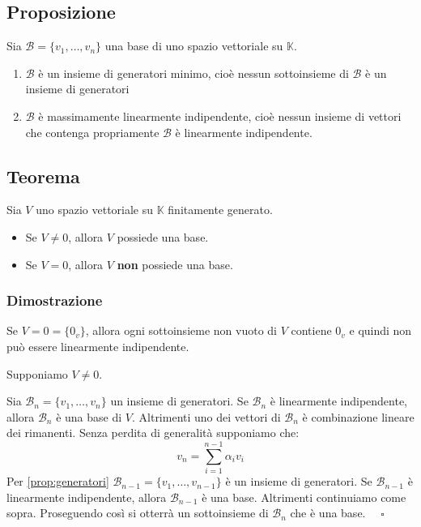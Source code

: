 \documentclass[a4paper]{article}
\theoremstyle{break}
\theoremstyle{break}
\theoremstyle{break}
\theoremstyle{break}
\begin{document}
\subsection{Proposizione}
Sia \( \mathcal{B} = \{v_1, \ldots, v_n\}  \) una base di uno spazio vettoriale su
\( \mathbb{K} \).
\begin{enumerate}
  \item \( \mathcal{B} \) è un insieme di generatori minimo, cioè nessun sottoinsieme di
    \( \mathcal{B} \) è un insieme di generatori
  \item \( \mathcal{B} \) è massimamente linearmente indipendente, cioè nessun insieme di
    vettori che contenga propriamente \( \mathcal{B} \) è linearmente indipendente.
\end{enumerate}

\subsection{Teorema}
Sia \( V \) uno spazio vettoriale su \( \mathbb{K} \) finitamente generato.
\begin{itemize}
  \item Se \( V \neq 0 \), allora \( V \) possiede una base.
  \item Se \( V = 0 \), allora \( V \) \textbf{non} possiede una base.
\end{itemize}

\subsubsection{Dimostrazione}
Se \( V = 0 = \{0_v\}  \), allora ogni sottoinsieme non vuoto di \( V \) contiene \( 0_v \) 
e quindi non può essere linearmente indipendente.

\vspace{1em}
\noindent Supponiamo \( V \neq 0 \).

\noindent Sia \( \mathcal{B}_n = \{v_1, \ldots, v_n\}  \) un insieme di generatori.
Se \( \mathcal{B}_n \) è linearmente indipendente, allora \( \mathcal{B}_n \) è una base
di \( V \). Altrimenti uno dei vettori di \( \mathcal{B}_n \) è combinazione lineare
dei rimanenti. Senza perdita di generalità supponiamo che:
\[
v_n = \sum_{i=1}^{n-1} \alpha_i v_i
\] 
Per \ref{prop:generatori} \( \mathcal{B}_{n-1} = \{v_1, \ldots, v_{n-1}\}  \) è un 
insieme di generatori. Se \( \mathcal{B}_{n-1} \) è linearmente indipendente, allora
\( \mathcal{B}_{n-1} \) è una base. Altrimenti continuiamo come sopra.
Proseguendo così si otterrà un sottoinsieme di \( \mathcal{B}_n \) che è una base.
\( \quad \square \) 
\end{document}
